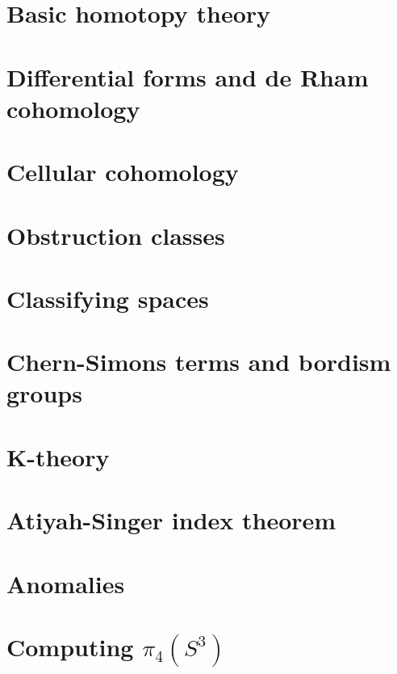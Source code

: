 \documentclass[12pt]{article}
\numberwithin{equation}{section}
\begin{document}
\section{Basic homotopy theory}

\section{Differential forms and de Rham cohomology}

\section{Cellular cohomology}

\section{Obstruction classes}

\section{Classifying spaces}

\section{Chern-Simons terms and bordism groups}

\section{K-theory}

\section{Atiyah-Singer index theorem}

\section{Anomalies}

\section{Computing \texorpdfstring{$\pi_4(S^3)$}{pi4(S3)}}



\end{document}
